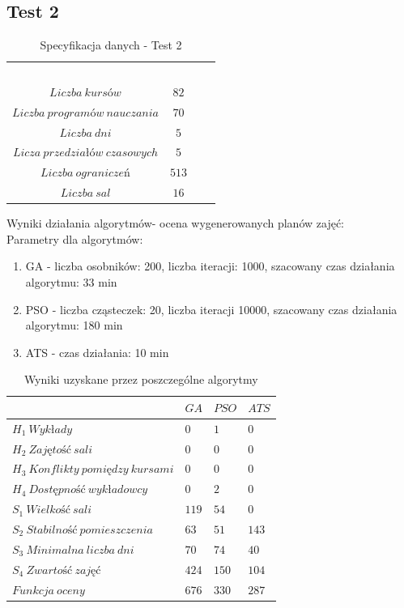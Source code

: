 \subsection{Test 2}
\begin{table}[H]
\begin{center}

\begin{tabular}{ |c|c|c|c| }
\multicolumn{1}{r}{}
 &  \multicolumn{1}{c}{$$}
 & \multicolumn{1}{c}{$$} 
 \\
\cline{1-2}
$Liczba\ kursów$ & $82$\\
\cline{1-2}
$Liczba\ programów\ nauczania$ & $70$\\
\cline{1-2}
$Liczba\ dni$ & $5$ \\
\cline{1-2}
$Licza\ przedziałów\ czasowych$ & $5$ \\
\cline{1-2}
$Liczba\ ograniczeń$ & $513$ \\
\cline{1-2}
$Liczba\ sal$ & $16$ \\
\cline{1-2}
\end{tabular}
\end{center}
\caption {Specyfikacja danych - Test 2}
\end{table}
\par Wyniki działania algorytmów- ocena wygenerowanych planów zajęć: \\
Parametry dla algorytmów:
\begin{enumerate}
\item GA - liczba osobników: 200, liczba iteracji: 1000, szacowany czas działania algorytmu: 33 min
\item PSO - liczba cząsteczek: 20, liczba iteracji 10000, szacowany czas działania algorytmu: 180 min
\item ATS - czas działania: 10 min
\end{enumerate}
\begin{table}[H]
\begin{center}

\begin{tabular}{ |l|l|l|l| }
\hline
 & $GA$ & $PSO$ & $ATS$\\
\hline
${H}_{1}\ Wykłady$ & $0$ & $1$ & $0$\\
\hline
$H_{2}\ Zajętość\ sali$ & $0$ & $0$ & $0$\\
\hline
$H_{3}\ Konflikty\ pomiędzy\ kursami$ & $0$ & $0$ & $0$ \\
\hline
$H_{4}\ Dostępność\ wykładowcy$ & $0$ & $2$ & $0$ \\
\hline
$S_{1}\ Wielkość\ sali$ & $119$ & $54$ & $0$ \\
\hline
$S_{2}\ Stabilność\ pomieszczenia$ & $63$ & $51$ & $143$ \\
\hline
$S_{3}\ Minimalna\ liczba\ dni$ & $70$ & $74$ & $40$ \\
\hline
$S_{4}\ Zwartość\ zajęć$ & $424$ & $150$ & $104$ \\
\hline
$Funkcja\ oceny$ & $676$ & $330$ & $287$ \\
\hline
\end{tabular}
\end{center}
\caption {Wyniki uzyskane przez poszczególne algorytmy}
\end{table}
